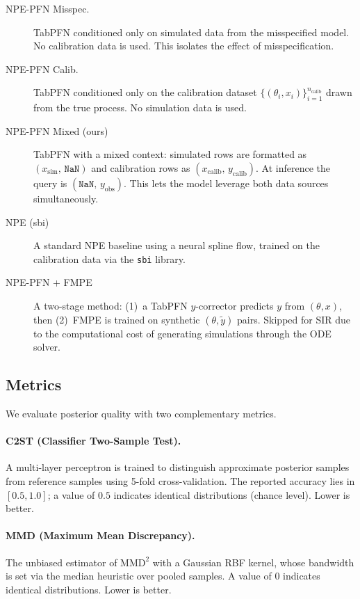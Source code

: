 \documentclass[11pt]{article}
\begin{document}
\begin{description}
  \item[NPE-PFN Misspec.]
    TabPFN conditioned only on simulated data from the misspecified
    model. No calibration data is used. This isolates the effect of
    misspecification.

  \item[NPE-PFN Calib.]
    TabPFN conditioned only on the calibration dataset
    $\{(\theta_i, x_i)\}_{i=1}^{n_{\mathrm{calib}}}$ drawn from the
    true process. No simulation data is used.

  \item[NPE-PFN Mixed (ours)]
    TabPFN with a mixed context: simulated rows are formatted as
    $(x_{\mathrm{sim}},\, \texttt{NaN})$ and calibration rows as
    $(x_{\mathrm{calib}},\, y_{\mathrm{calib}})$.
    At inference the query is $(\texttt{NaN},\, y_{\mathrm{obs}})$.
    This lets the model leverage both data sources simultaneously.

  \item[NPE (sbi)]
    A standard NPE baseline using a neural spline flow, trained on the
    calibration data via the \texttt{sbi} library.

  \item[NPE-PFN + FMPE]
    A two-stage method: (1)~a TabPFN $y$-corrector predicts $y$ from
    $(\theta, x)$, then (2)~FMPE is trained on synthetic
    $(\theta, \tilde y)$ pairs.  Skipped for SIR due to the
    computational cost of generating simulations through the ODE solver.
\end{description}

\subsection{Metrics}

We evaluate posterior quality with two complementary metrics.

\paragraph{C2ST (Classifier Two-Sample Test).}
A multi-layer perceptron is trained to distinguish approximate posterior
samples from reference samples using 5-fold cross-validation.
The reported accuracy lies in $[0.5, 1.0]$; a value of $0.5$
indicates identical distributions (chance level).
Lower is better.

\paragraph{MMD (Maximum Mean Discrepancy).}
The unbiased estimator of $\mathrm{MMD}^2$ with a Gaussian RBF kernel,
whose bandwidth is set via the median heuristic over pooled samples.
A value of $0$ indicates identical distributions.
Lower is better.
\end{document}
